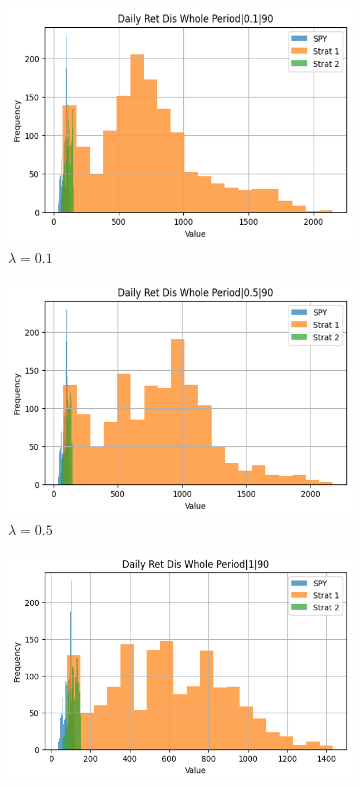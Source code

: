 \documentclass[12pt]{article}
\begin{document}
\begin{figure}[H]
\centering
\begin{subfigure}{0.32\textwidth}
\includegraphics[width=\linewidth]{"plots/daily_ret_dis_whole_period_0.1_90.png"}
\caption{$\lambda=0.1$}
\end{subfigure}
\begin{subfigure}{0.32\textwidth}
\includegraphics[width=\linewidth]{"plots/daily_ret_dis_whole_period_0.5_90.png"}
\caption{$\lambda=0.5$}
\end{subfigure}
\begin{subfigure}{0.32\textwidth}
\includegraphics[width=\linewidth]{"plots/daily_ret_dis_whole_period_1_90.png"}

\end{subfigure}
\end{figure}
\end{document}
